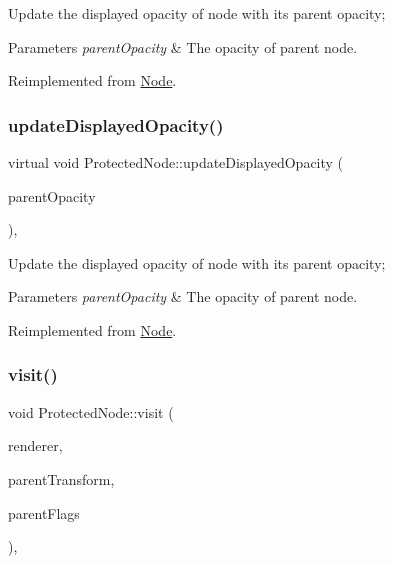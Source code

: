 Update the displayed opacity of node with it\textquotesingle{}s parent opacity; 
\begin{DoxyParams}{Parameters}
{\em parent\+Opacity} & The opacity of parent node. \\
\hline
\end{DoxyParams}


Reimplemented from \hyperlink{classNode_a3a0122884e7e1ce310b8b68abfbb245b}{Node}.

\mbox{\label{classProtectedNode_aef8f27d6204a82d0ed5372e9082d12ae}} 
\subsubsection{\texorpdfstring{update\+Displayed\+Opacity()}{updateDisplayedOpacity()}\hspace{0.1cm}{\footnotesize\ttfamily [2/2]}}
{\footnotesize\ttfamily virtual void Protected\+Node\+::update\+Displayed\+Opacity (\begin{DoxyParamCaption}\item[{G\+Lubyte}]{parent\+Opacity }\end{DoxyParamCaption})\hspace{0.3cm}{\ttfamily [override]}, {\ttfamily [virtual]}}

Update the displayed opacity of node with it\textquotesingle{}s parent opacity; 
\begin{DoxyParams}{Parameters}
{\em parent\+Opacity} & The opacity of parent node. \\
\hline
\end{DoxyParams}


Reimplemented from \hyperlink{classNode_a3a0122884e7e1ce310b8b68abfbb245b}{Node}.

\mbox{\label{classProtectedNode_afb1b2f3712d91a38bd5c691eeec6bbb9}} 
\subsubsection{\texorpdfstring{visit()}{visit()}\hspace{0.1cm}{\footnotesize\ttfamily [1/2]}}
{\footnotesize\ttfamily void Protected\+Node\+::visit (\begin{DoxyParamCaption}\item[{\hyperlink{classRenderer}{Renderer} $\ast$}]{renderer,  }\item[{const \hyperlink{classMat4}{Mat4} \&}]{parent\+Transform,  }\item[{uint32\+\_\+t}]{parent\+Flags }\end{DoxyParamCaption})\hspace{0.3cm}{\ttfamily [override]}, {\ttfamily [virtual]}}

